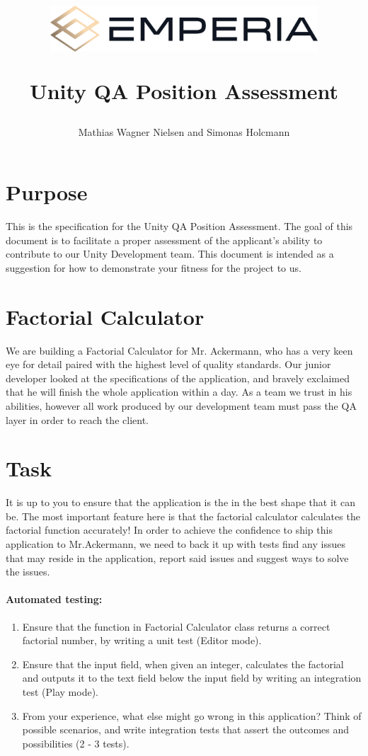 \documentclass[12pt]{article}
\title{
{\includegraphics[width=10cm]{logo.png}}

{Unity QA Position Assessment}}
\author{Mathias Wagner Nielsen and Simonas Holcmann}
\begin{document}
\maketitle
\section{Purpose}
This is the specification for the Unity QA Position Assessment.
The goal of this document is to facilitate a proper assessment of the applicant's ability to contribute to our Unity Development team.
This document is intended as a suggestion for how to demonstrate your fitness for the project to us.

\section{Factorial Calculator}
We are building a Factorial Calculator for Mr. Ackermann, who has a very keen eye for detail paired with the highest level of quality standards. Our junior developer looked at the specifications of the application, and bravely exclaimed that he will finish the whole application within a day. As a team we trust in his abilities, however all work produced by our development team must pass the QA layer in order to reach the client.

\section{Task}
It is up to you to ensure that the application is the in the best shape that it can be. The most important feature here is that the factorial calculator calculates the factorial function accurately! In order to achieve the confidence to ship this application to Mr.Ackermann, we need to back it up with tests find any issues that may reside in the application, report said issues and suggest ways to solve the issues.
\paragraph{Automated testing:}
	\begin{enumerate}
				\item Ensure that the function in Factorial Calculator class returns a correct factorial number, by writing a unit test (Editor mode).
				\item Ensure that the input field, when given an integer, calculates the factorial and outputs it to the text field below the input field by writing an integration test (Play mode).
                \item From your experience, what else might go wrong in this application? Think of possible scenarios, and write integration tests that assert the outcomes and possibilities (2 - 3 tests).
	\end{enumerate}
\end{document}
